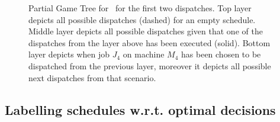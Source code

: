 \begin{figure}
  
  \vspace{-27pt}
  \caption[Partial Game Tree for \jsp]{Partial Game Tree for \jsp\ for the 
    first two dispatches. 
    Top layer depicts all possible dispatches (dashed) for an empty schedule. 
    Middle layer depicts all possible dispatches given that one of the 
    dispatches from the layer above has been executed (solid). 
    Bottom layer depicts when job $J_4$ on machine $M_4$ has been chosen to be 
    dispatched from the previous layer, moreover it depicts all possible next 
    dispatches from that scenario.}
  \label{fig:jssp:gametree}
\end{figure}

\subsection{Labelling schedules w.r.t. optimal 
decisions}\label{sec:gentrdat:labelling}